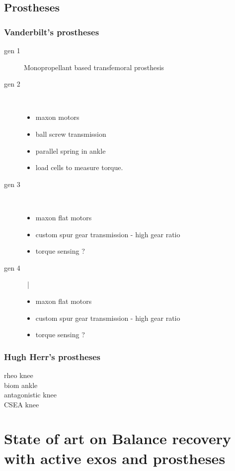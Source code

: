\subsection{Prostheses}
\subsubsection{Vanderbilt's prostheses}
    \begin{description}
        \item[gen 1] Monopropellant based transfemoral prosthesis
        \item[gen 2] \phantom{text} ~\\
        \begin{itemize}
                \item maxon motors
                \item ball screw transmission
                \item parallel spring in ankle
                \item load cells to measure torque.
            \end{itemize}
        \item[gen 3] ~\\
            \begin{itemize}
                \item maxon flat motors
                \item custom spur gear transmission - high gear ratio
                \item torque sensing ?
            \end{itemize}
        \item[gen 4] ~|\
            \begin{itemize}
                \item maxon flat motors
                \item custom spur gear transmission - high gear ratio
                \item torque sensing ?
            \end{itemize}
    \end{description}
\subsubsection{Hugh Herr's prostheses}
    \begin{description}
        \item[rheo knee]
        \item[biom ankle]
        \item[antagonistic knee]
        \item[CSEA knee]
    \end{description}

\section{State of art on Balance recovery with active exos and prostheses}